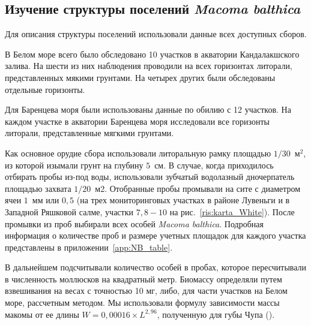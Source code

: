 
\afterpage{\clearpage}	

	\subsection{Изучение структуры поселений {\it Macoma balthica}}
Для описания структуры поселений использовали данные всех доступных сборов.

В Белом море всего было обследовано 10 участков в акватории Кандалакшского залива. 
На шести из них наблюдения проводили на всех горизонтах литорали, представленных мякими грунтами.
На четырех других были обследованы отдельные горизонты. 

Для Баренцева моря были использованы данные по обилию с 12 участков. На каждом участке в акватории Баренцева моря исследовали все  горизонты литорали, представленные мягкими грунтами.  

Как основное орудие сбора использовали литоральную рамку площадью $1/30$~м$^2$, из которой изымали грунт на глубину $5$~см. 
В случае, когда приходилось отбирать пробы из-под воды, использовали зубчатый водолазный дночерпатель площадью захвата $1/20$~м2.
Отобранные пробы промывали на сите с диаметром ячеи $1$~мм или $0,5$ (на трех мониторинговых участках в районе Лувеньги и в Западной Ряшковой салме, участки $7, 8 - 10$ на рис.~\ref{ris:karta_White}). 
После промывки из   проб   выбирали   всех   особей  {\it Macoma balthica}.
Подробная информация о количестве проб и размере учетных площадок для каждого участка представлены в приложении~\ref{app:NB_table}.

В дальнейшем подсчитывали количество особей в пробах, которое пересчитывали в численность моллюсков на квадратный метр. 
Биомассу определяли путем взвешивания на весах с точностью 10 мг, либо, для части участков на Белом море, рассчетным методом.
Мы использовали формулу зависимости массы макомы от ее длины $W = 0,00016 \times L^{2,96}$, полученную для губы Чупа (\cite{Maximovich_et_al_1993}).


